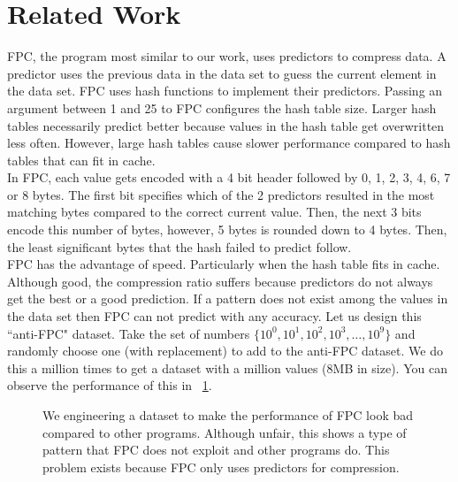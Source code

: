 \section{Related Work}
\label{sec:relatedWork}
FPC, the program most similar to our work, uses predictors to compress data. A predictor uses the previous data in the data set to guess the current element in the data set. FPC uses hash functions to implement their predictors. Passing an argument between 1 and 25 to FPC configures the hash table size. Larger hash tables necessarily predict better because values in the hash table get overwritten less often. However, large hash tables cause slower performance compared to hash tables that can fit in cache.\\
\indent In FPC, each value gets encoded with a 4 bit header followed by 0, 1, 2, 3, 4, 6, 7 or 8 bytes. The first bit specifies which of the 2 predictors resulted in the most matching bytes compared to the correct current value. Then, the next 3 bits encode this number of bytes, however, 5 bytes is rounded down to 4 bytes. Then, the least significant bytes that the hash failed to predict follow.\\
\indent FPC has the advantage of speed. Particularly when the hash table fits in cache. Although good, the compression ratio suffers because predictors do not always get the best or a good prediction. If a pattern does not exist among the values in the data set then FPC can not predict with any accuracy. Let us design this ``anti-FPC" dataset. Take the set of numbers $\{10^0, 10^1, 10^2, 10^3, \dots, 10^9\}$ and randomly choose one (with replacement) to add to the anti-FPC dataset. We do this a million times to get a dataset with a million values (8MB in size). You can observe the performance of this in \figurename~\ref{fig:antiFpc}.\\
\begin{figure}
\caption{We engineering a dataset to make the performance of FPC look bad compared to other programs. Although unfair, this shows a type of pattern that FPC does not exploit and other programs do. This problem exists because FPC only uses predictors for compression.}
\label{fig:antiFpc}
\end{figure}

